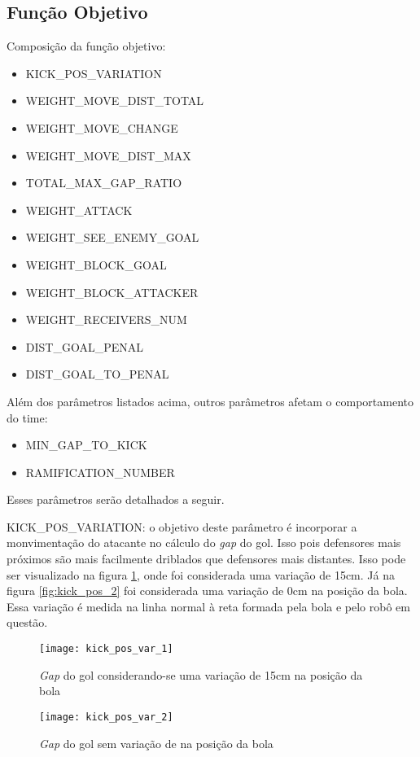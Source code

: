 \subsection{Função Objetivo}

Composição da função objetivo:
\begin{itemize}
  \item KICK_POS_VARIATION
  \item WEIGHT_MOVE_DIST_TOTAL
  \item WEIGHT_MOVE_CHANGE
  \item WEIGHT_MOVE_DIST_MAX
  \item TOTAL_MAX_GAP_RATIO
  \item WEIGHT_ATTACK
  \item WEIGHT_SEE_ENEMY_GOAL
  \item WEIGHT_BLOCK_GOAL
  \item WEIGHT_BLOCK_ATTACKER
  \item WEIGHT_RECEIVERS_NUM
  \item DIST_GOAL_PENAL
  \item DIST_GOAL_TO_PENAL
\end{itemize}

Além dos parâmetros listados acima, outros parâmetros
afetam o comportamento do time:
\begin{itemize}
  \item MIN_GAP_TO_KICK
  \item RAMIFICATION_NUMBER
\end{itemize}

Esses parâmetros serão detalhados a seguir.

KICK_POS_VARIATION: o objetivo deste parâmetro é incorporar a monvimentação
do atacante no cálculo do \textit{gap} do gol. Isso pois defensores mais
próximos são mais facilmente driblados que defensores mais distantes. Isso
pode ser visualizado na figura \ref{fig:kick_pos_1}, onde foi considerada
uma variação de 15cm. Já na figura \ref{fig:kick_pos_2} foi considerada uma
variação de 0cm na posição da bola. Essa variação é medida na linha normal
à reta formada pela bola e pelo robô em questão.

\begin{figure}[h]
  \centering
  \texttt{[image: kick\_pos\_var\_1]}
  \caption{\textit{Gap} do gol considerando-se uma variação de 15cm na 
           posição da bola}\label{fig:kick_pos_1}
  \texttt{[image: kick\_pos\_var\_2]}
  \caption{\textit{Gap} do gol sem variação de na posição da
           bola}\label{fig:kick_pos_1}
\end{figure}


